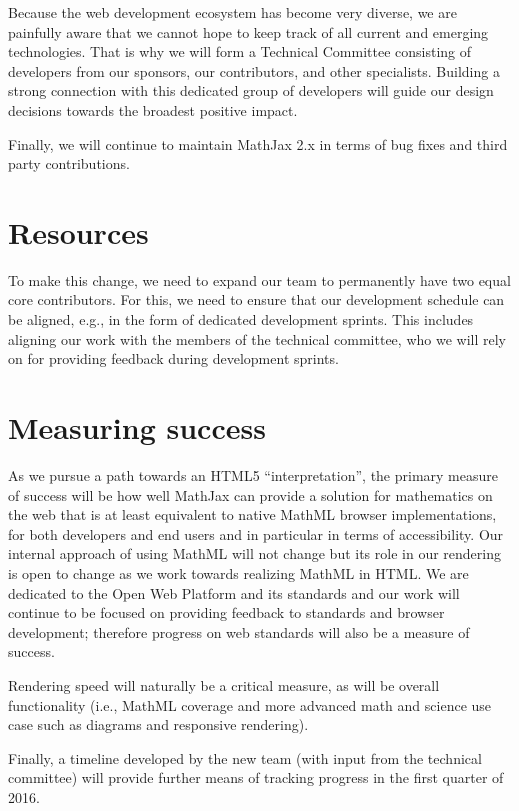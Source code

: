 \documentclass[]{amsart}
\begin{document}
Because the web development ecosystem has become very diverse, we are
painfully aware that we cannot hope to keep track of all current and
emerging technologies. That is why we will form a Technical Committee
consisting of developers from our sponsors, our contributors, and other
specialists. Building a strong connection with this dedicated group of
developers will guide our design decisions towards the broadest positive
impact.

Finally, we will continue to maintain MathJax 2.x in terms of bug fixes
and third party contributions.

\section{Resources}\label{resources}

To make this change, we need to expand our team to permanently have two
equal core contributors. For this, we need to ensure that our
development schedule can be aligned, e.g., in the form of dedicated
development sprints. This includes aligning our work with the members of
the technical committee, who we will rely on for providing feedback
during development sprints.

\section{Measuring success}\label{measuring-success}

As we pursue a path towards an HTML5 ``interpretation'', the primary
measure of success will be how well MathJax can provide a solution for
mathematics on the web that is at least equivalent to native MathML
browser implementations, for both developers and end users and in
particular in terms of accessibility. Our internal approach of using
MathML will not change but its role in our rendering is open to change
as we work towards realizing MathML in HTML. We are dedicated to the
Open Web Platform and its standards and our work will continue to be
focused on providing feedback to standards and browser development;
therefore progress on web standards will also be a measure of success.

Rendering speed will naturally be a critical measure, as will be overall
functionality (i.e., MathML coverage and more advanced math and science
use case such as diagrams and responsive rendering).

Finally, a timeline developed by the new team (with input from the
technical committee) will provide further means of tracking progress in
the first quarter of 2016.
\end{document}
